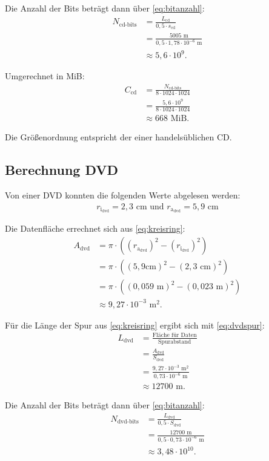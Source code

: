 \documentclass[9pt,twocolumn,twoside]{pnas-new}
\begin{document}
Die Anzahl der Bits beträgt dann über \eqref{eq:bitanzahl}:
\begin{align*}
N_{\mbox{cd-bits}} &=  \frac{L_{\mbox{cd}}}{0,5\cdot s_{\mbox{cd}}}\\
&= \frac{5005\mbox{ m}}{0,5 \cdot 1,78 \cdot 10^{-6}\mbox{ m}}\\
&\approx 5,6 \cdot 10^9.
\end{align*}

Umgerechnet in MiB:
\begin{align*}
C_{\mbox{cd}} &= \frac{N_{\mbox{cd-bits}}}{8\cdot1024\cdot1024}\\
&= \frac{ 5,6\cdot10^9}{8\cdot1024\cdot1024}\\
&\approx 668\mbox{ MiB}.
\end{align*}

Die Größenordnung entspricht der einer handelsüblichen CD.

\subsection{Berechnung DVD}
Von einer DVD konnten die folgenden Werte abgelesen werden: 
\begin{align*}
 r_{\mbox{i}_{\mbox{dvd}}} = 2,3 \mbox{ cm und } r_{\mbox{a}_{\mbox{dvd}}} = 5,9 \mbox{ cm} 
\end{align*}

\indent Die Datenfläche errechnet sich aus \eqref{eq:kreisring}:
\begin{align*}
 A_{\mbox{dvd}} &= \pi\cdot((r_{\mbox{a}_{\mbox{dvd}}})^2-(r_{\mbox{i}_{\mbox{dvd}}})^2)  \\	
&= \pi\cdot((5,9\mbox{cm})^2-(2,3\mbox{ cm})^2) \\
 &=  \pi\cdot((0,059\mbox{ m})^2-(0,023\mbox{ m})^2) \\
 &\approx 9,27\cdot10^{-3}\mbox{ m}^2.
\end{align*}

Für die Länge der Spur aus \eqref{eq:kreisring} ergibt sich mit \eqref{eq:dvdspur}:
\begin{align*}
 L_{\mbox{dvd}} &= \frac{\mbox{Fläche für Daten}}{\mbox{Spurabstand}}\\
 &= \frac{A_{\mbox{dvd}}}{S_{\mbox{dvd}}}\\
 &= \frac{9,27\cdot10^{-3}\mbox{ m}^2}{0,73\cdot10^{-6}\mbox{ m} }\\
 &\approx 12700\mbox{ m}.
\end{align*}

Die Anzahl der Bits beträgt dann über \eqref{eq:bitanzahl}:
\begin{align*}
N_{\mbox{dvd-bits}} &=  \frac{L_{\mbox{dvd}}}{0,5\cdot S_{\mbox{dvd}}}\\
&= \frac{12700\mbox{ m}}{0,5\cdot 0,73\cdot10^{-6}\mbox{ m}}\\
&\approx 3,48\cdot 10^{10}.
\end{align*}
\end{document}
